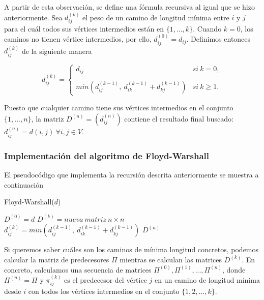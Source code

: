 A partir de esta observación, se define una fórmula recursiva al igual que se hizo anteriormente. Sea $d_{ij}^{(k)}$ el peso de un camino de longitud mínima entre $i$ y $j$ para el cuál todos sus vértices intermedios están en $\{1,...,k\}$. Cuando $k=0$, los caminos no tienen vértice intermedios, por ello, $d_{ij}^{(0)}=d_{ij}$. Definimos entonces $d_{ij}^{(k)}$ de la siguiente manera

$$d_{ij}^{(k)}= \left\{ \begin{array}{lcc}
	d_{ij} &   si\ k=0, \\
	\\ min(d_{ij}^{(k-1)},\ d_{ik}^{(k-1)}+d_{kj}^{(k-1)}) & si\ k\geq 1.
\end{array}
\right.$$

Puesto que cualquier camino tiene sus vértices intermedios en el conjunto $\{1,...,n\}$, la matriz $D^{(n)}=(d_{ij}^{(n)})$ contiene el resultado final buscado: $d_{ij}^{(n)}=d(i,j)\ \forall i,j\in V.$

\subsubsection{Implementación del algoritmo de Floyd-Warshall}

El pseudocódigo que implementa la recursión descrita anteriormente se muestra a continuación

\begin{breakablealgorithm}
	\caption{Floyd-Warshall($d$)}
	\begin{algorithmic}[1]
		\State $D^{(0)}=d$
			\State $D^{(k)}=nueva\ matriz\ n\times n$
					\State $d_{ij}^{(k)}=min(d_{ij}^{(k-1)},\ d_{ik}^{(k-1)}+d_{kj}^{(k-1)})$
				\EndFor
			\EndFor
		\EndFor
		\Return $D^{(n)}$
	\end{algorithmic}
\end{breakablealgorithm}

Si queremos saber cuáles son los caminos de mínima longitud concretos, podemos calcular la matriz de predecesores $\Pi$ mientras se calculan las matrices $D^{(k)}$. En concreto, calculamos una secuencia de matrices $\Pi^{(0)},\Pi^{(1)},...,\Pi^{(n)}$, donde $\Pi^{(n)}=\Pi$ y $\pi_{ij}^{(k)}$ es el predecesor del vértice $j$ en un camino de longitud mínima desde $i$ con todos los vértices intermedios en el conjunto $\{1,2,...,k\}$. \\

